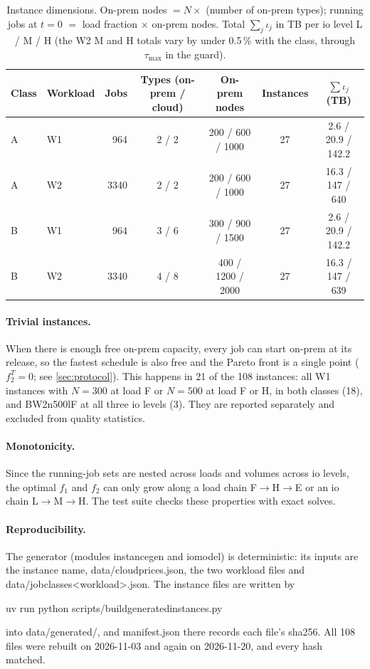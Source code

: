 \documentclass[11pt,a4paper]{article}
\newcommand{\ioVol}{\iota_j}
\newcommand{\codeus}{\textunderscore\allowbreak}
\newcommand{\code}[1]{{\ttfamily\let\_\codeus #1}}
\begin{document}
\begin{table}[ht]
\centering\small
\caption{Instance dimensions. On-prem nodes $= N\times$ (number of on-prem types);
running jobs at $t=0$ $=$ load fraction $\times$ on-prem nodes. Total
$\sum_j\ioVol$ in TB per io level L / M / H (the W2 M and H totals vary by
under 0.5\,\% with the class, through $\tau_{\max}$ in the guard).}
\label{tab:instances}
\setlength{\tabcolsep}{4pt}
\begin{tabular}{llrcccc}
\toprule
Class & Workload & Jobs & Types (on-prem / cloud) & On-prem nodes & Instances & $\sum\ioVol$ (TB) \\
\midrule
A & W1 & 964 & 2 / 2 & 200 / 600 / \num{1000} & 27 & 2.6 / 20.9 / 142.2 \\
A & W2    & \num{3340} & 2 / 2 & 200 / 600 / \num{1000} & 27 & 16.3 / 147 / 640 \\
B & W1 & 964 & 3 / 6 & 300 / 900 / \num{1500} & 27 & 2.6 / 20.9 / 142.2 \\
B & W2    & \num{3340} & 4 / 8 & 400 / \num{1200} / \num{2000} & 27 & 16.3 / 147 / 639 \\
\bottomrule
\end{tabular}
\end{table}

\paragraph{Trivial instances.} When there is enough free on-prem capacity, every
job can start on-prem at its release, so the fastest schedule is also free and the
Pareto front is a single point ($f_2^T=0$; see \cref{sec:protocol}). This happens
in 21 of the 108 instances: all W1 instances with $N=300$ at load F or
$N=500$ at load F or H, in both classes (18), and \code{B\_W2\_n500\_lF} at all
three io levels (3). They are reported separately and excluded from quality
statistics.

\paragraph{Monotonicity.} Since the running-job sets are nested across loads and
volumes across io levels, the optimal $f_1$ and $f_2$ can only grow along a load
chain F$\to$H$\to$E or an io chain L$\to$M$\to$H. The test suite checks these
properties with exact solves.

\paragraph{Reproducibility.} The generator (modules \code{instance\_gen} and
\code{io\_model}) is deterministic: its inputs are the instance name,
\code{data/cloud\_prices.json}, the two workload files and
\code{data/job\_classes\_<workload>.json}. The instance files are written by
\begin{center}
\code{uv run python scripts/build\_generated\_instances.py}
\end{center}
into \code{data/generated/}, and \code{manifest.json} there records each file's
sha256. All 108 files were rebuilt on 2026-11-03 and again on 2026-11-20, and every
hash matched.
\end{document}
